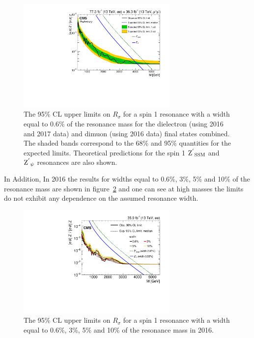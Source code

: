 \begin{figure}[!htb]
\centering
\includegraphics[width=0.7\textwidth]{figures/Zprime/2017/limitInputs/limitPlot_Combination_forApproval.pdf}
 \caption{The 95\% CL upper limits on $R_\sigma$ for a spin 1 resonance with a width equal to 0.6\% of the resonance mass for the dielectron (using 2016 and 2017 data) and dimuon (using 2016 data) final states combined. The shaded bands correspond to the 68\% and 95\% quantities for the expected limits.  Theoretical predictions for the spin 1 $\mathrm{Z^{'}}_\mathrm{SSM}$ and $\mathrm{Z^{'}}_\mathrm{\psi}$ resonances are also shown.}
\label{fig:limit_comb}
\end{figure}

In Addition, In 2016 the results for widths equal to 0.6\%, 3\%, 5\% and 10\% of the resonance mass are shown in figure~\ref{fig:limit_ee_width} and one can see at high masses the limits do not exhibit any dependence on the assumed resonance width.
\begin{figure}[!htb]
\centering
\includegraphics[width=0.7\textwidth]{figures/Zprime/2016/paper/Figure_004-a.pdf}
 \caption{The 95\% CL upper limits on $R_\sigma$ for a spin 1 resonance with a width equal to 0.6\%, 3\%, 5\% and 10\% of the resonance mass in 2016.}
\label{fig:limit_ee_width}
\end{figure}

